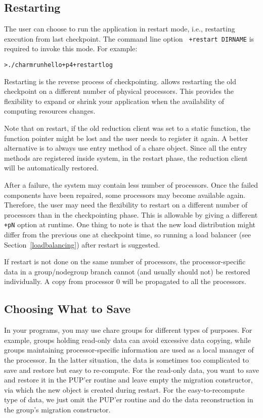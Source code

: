 \subsection{Restarting}

The user can choose to run the \charmpp{} application in restart mode, i.e.,
restarting execution from last checkpoint. The command line option {\tt
+restart DIRNAME} is required to invoke this mode. For example:

\begin{alltt}
  > ./charmrun hello +p4 +restart log
\end{alltt}

Restarting is the reverse process of checkpointing. \charmpp{} allows 
restarting the old checkpoint on a different number of physical processors.
This provides the flexibility to expand or shrink your application when
the availability of computing resources changes. 

Note that on restart, if the old reduction client was set to a static 
function, the function pointer might be lost and the user needs to register
it again. A better alternative is to always use entry method of a chare
object. Since all the entry methods are registered inside \charmpp{} system,
in the restart phase, the reduction client will be automatically restored.

After a failure, the system may contain less number of processors. Once the failed components have been repaired, some processors may become available again. Therefore,
the user may need the flexibility to restart on a different number of processors
than in the checkpointing phase. This is allowable by giving a different 
{\tt +pN} option at runtime. One thing to note is that the new load 
distribution might differ from the previous one at checkpoint time,
so running a load balancer (see Section~\ref{loadbalancing}) after restart is suggested. 

If restart is not done on the same number of processors, the processor-specific
data in a group/nodegroup branch cannot (and usually should not) be 
restored individually. A copy from processor 0 will be propagated to all 
the processors.

\subsection{Choosing What to Save}

In your programs, you may use chare groups for different types of purposes. 
For example, groups holding read-only data can avoid excessive data copying,
while groups maintaining processor-specific information are used as a local
manager of the processor. In the latter situation, the data is sometimes
too complicated to save and restore but easy to re-compute. For the read-only
data, you want to save and restore it in the PUP'er routine and leave empty
the migration constructor, via which the new object is created during restart.
For the easy-to-recompute type of data, we just omit the PUP'er routine and
do the data reconstruction in the group's migration constructor.

